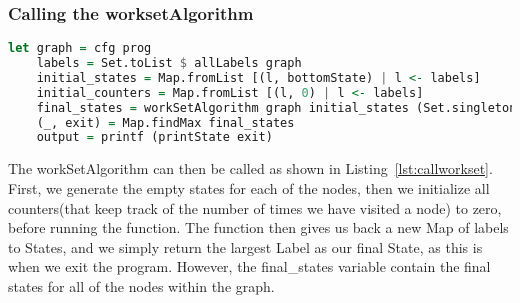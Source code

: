 \subsubsection{Calling the worksetAlgorithm}
\begin{lstlisting}[language={haskell}, caption={Calling the workset algorithm}, label={lst:callworkset}]
let graph = cfg prog
    labels = Set.toList $ allLabels graph
    initial_states = Map.fromList [(l, bottomState) | l <- labels]
    initial_counters = Map.fromList [(l, 0) | l <- labels]
    final_states = workSetAlgorithm graph initial_states (Set.singleton $ Set.elemAt 0 graph) initial_counters
    (_, exit) = Map.findMax final_states
    output = printf (printState exit)
\end{lstlisting}

The workSetAlgorithm can then be called as shown in
Listing~\ref{lst:callworkset}. First, we generate the empty states for each of
the nodes, then we initialize all counters(that keep track of the number of
times we have visited a node) to zero, before running the function. The
function then gives us back a new Map of labels to States, and we simply return
the largest Label as our final State, as this is when we exit the program.
However, the final\_states variable contain the final states for all of the
nodes within the graph.
